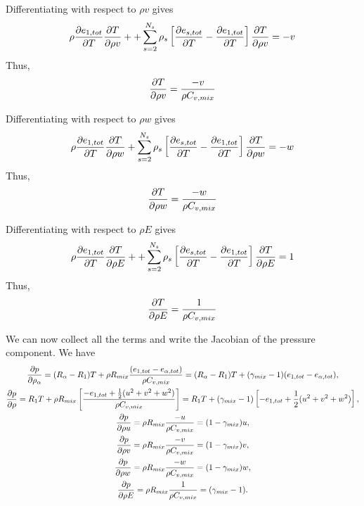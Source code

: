 Differentiating with respect to $\rho v$ gives
%
\begin{equation*}
\rho \frac{\partial e_{1,tot}}{\partial T} \frac{\partial T}{\partial \rho v} + + \sum_{s=2}^{N_s} \rho_s \left[ \frac{\partial e_{s,tot}}{\partial T} - \frac{\partial e_{1,tot}}{\partial T} \right] \frac{\partial T}{\partial \rho v} = -v
\end{equation*}
%
Thus,
%
\begin{equation*}
\frac{\partial T}{\partial \rho v} = \frac{-v}{\rho C_{v,mix}}
\end{equation*}
%

Differentiating with respect to $\rho w$ gives
%
\begin{equation*}
\rho \frac{\partial e_{1,tot}}{\partial T} \frac{\partial T}{\partial \rho w} + \sum_{s=2}^{N_s} \rho_s \left[ \frac{\partial e_{s,tot}}{\partial T} - \frac{\partial e_{1,tot}}{\partial T} \right] \frac{\partial T}{\partial \rho w} = -w
\end{equation*}
%
Thus,
%
\begin{equation*}
\frac{\partial T}{\partial \rho w} = \frac{-w}{\rho C_{v,mix}}
\end{equation*}
%

Differentiating with respect to $\rho E$ gives
%
\begin{equation*}
\rho \frac{\partial e_{1,tot}}{\partial T} \frac{\partial T}{\partial \rho E} + + \sum_{s=2}^{N_s} \rho_s \left[ \frac{\partial e_{s,tot}}{\partial T} - \frac{\partial e_{1,tot}}{\partial T} \right] \frac{\partial T}{\partial \rho E} = 1
\end{equation*}
%
Thus,
%
\begin{equation*}
\frac{\partial T}{\partial \rho E} = \frac{1}{\rho C_{v,mix}}
\end{equation*}
%

We can now collect all the terms and write the Jacobian of the
pressure component.  We have
%
\begin{gather*}
\frac{\partial p}{\partial \rho_{\alpha}} = (R_{\alpha} - R_1) T + \rho R_{mix} \frac{(e_{1,tot} - e_{\alpha, tot})}{\rho C_{v,mix}} = (R_{\alpha} - R_1) T + (\gamma_{mix} - 1) (e_{1,tot} - e_{\alpha, tot}), \\
\frac{\partial p}{\partial \rho} = R_1 T + \rho R_{mix} \left[ \frac{-e_{1,tot} + \frac{1}{2} (u^2 + v^2 + w^2)}{\rho C_{v,mix}} \right] = R_1 T + (\gamma_{mix} - 1) \left[ -e_{1,tot} + \frac{1}{2} (u^2 + v^2 + w^2) \right], \\
\frac{\partial p}{\partial \rho u} = \rho R_{mix} \frac{-u}{\rho C_{v,mix}} = (1 - \gamma_{mix}) u, \\
\frac{\partial p}{\partial \rho v} = \rho R_{mix} \frac{-v}{\rho C_{v,mix}} = (1 - \gamma_{mix}) v, \\
\frac{\partial p}{\partial \rho w} = \rho R_{mix} \frac{-w}{\rho C_{v,mix}} = (1 - \gamma_{mix}) w, \\
\frac{\partial p}{\partial \rho E} = \rho R_{mix} \frac{1}{\rho C_{v,mix}} = (\gamma_{mix} - 1). \\
\end{gather*}
%

